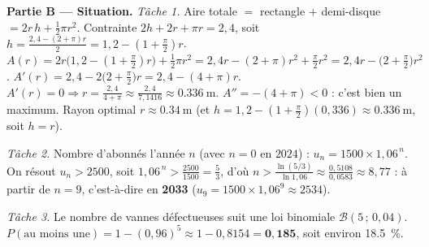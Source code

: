\smallskip
\noindent\textbf{Partie B — Situation.}
\emph{Tâche 1.} Aire totale $=$ rectangle $+$ demi-disque $=2r\,h+\frac12\pi r^2$.
Contrainte $2h+2r+\pi r=2{,}4$, soit $h=\frac{2{,}4-(2+\pi)r}{2}=1{,}2-(1+\tfrac\pi2)r$.
$A(r)=2r\big(1{,}2-(1+\tfrac\pi2)r\big)+\tfrac12\pi r^2=2{,}4r-(2+\pi)r^2+\tfrac\pi2 r^2
=2{,}4r-\big(2+\tfrac\pi2\big)r^2$.
$A'(r)=2{,}4-2\big(2+\tfrac\pi2\big)r=2{,}4-(4+\pi)r$. $A'(r)=0\Rightarrow r=\frac{2{,}4}{4+\pi}\approx\frac{2{,}4}{7{,}1416}\approx\SI{0,336}{\metre}$.
$A''=-(4+\pi)<0$ : c'est bien un maximum. Rayon optimal $r\approx\SI{0,34}{\metre}$
(et $h=1{,}2-(1+\tfrac\pi2)(0{,}336)\approx\SI{0,336}{\metre}$, soit $h=r$).

\emph{Tâche 2.} Nombre d'abonnés l'année $n$ (avec $n=0$ en $2024$) : $u_n=1500\times1{,}06^{\,n}$.
On résout $u_n>2500$, soit $1{,}06^{\,n}>\frac{2500}{1500}=\frac53$, d'où
$n>\frac{\ln(5/3)}{\ln1{,}06}\approx\frac{0{,}5108}{0{,}0583}\approx8{,}77$ : à partir de $n=9$, c'est-à-dire
en \textbf{2033} ($u_9=1500\times1{,}06^9\approx2534$).

\emph{Tâche 3.} Le nombre de vannes défectueuses suit une loi binomiale $\mathcal{B}(5\,;\,0{,}04)$.
$P(\text{au moins une})=1-(0{,}96)^5\approx1-0{,}8154=\mathbf{0{,}185}$, soit environ \SI{18,5}{\percent}.
